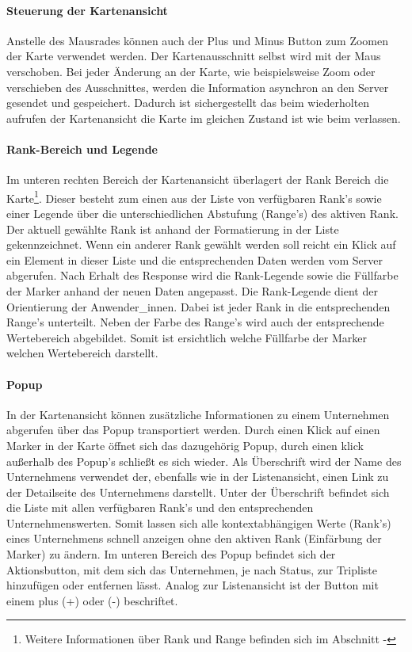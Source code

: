 \documentclass[Bachelorarbeit.tex]{subfiles}
\begin{document}
\paragraph{Steuerung der Kartenansicht}
Anstelle des Mausrades können auch der Plus und Minus Button zum Zoomen der Karte verwendet werden.
Der Kartenausschnitt selbst wird mit der Maus verschoben.
Bei jeder Änderung an der Karte, wie beispielsweise Zoom oder verschieben des Ausschnittes, werden die Information asynchron an den Server gesendet und gespeichert.
Dadurch ist sichergestellt das beim wiederholten aufrufen der Kartenansicht die Karte im gleichen Zustand ist wie beim verlassen.

\paragraph{Rank-Bereich und Legende}
Im unteren rechten Bereich der Kartenansicht überlagert der Rank Bereich die Karte\footnote{Weitere Informationen über Rank und Range befinden sich im Abschnitt  - }.
Dieser besteht zum einen aus der Liste von verfügbaren Rank's sowie einer Legende über die unterschiedlichen Abstufung (Range's) des aktiven Rank.
Der aktuell gewählte Rank ist anhand der Formatierung in der Liste gekennzeichnet. 
Wenn ein anderer Rank gewählt werden soll reicht ein Klick auf ein Element in dieser Liste und die entsprechenden Daten werden vom Server abgerufen. 
Nach Erhalt des Response wird die Rank-Legende sowie die Füllfarbe der Marker anhand der neuen Daten angepasst.
Die Rank-Legende dient der Orientierung der Anwender\_innen. 
Dabei ist jeder Rank in die entsprechenden Range's unterteilt.
Neben der Farbe des Range's wird auch der entsprechende Wertebereich abgebildet.
Somit ist ersichtlich welche Füllfarbe der Marker welchen Wertebereich darstellt.

\paragraph{Popup}
In der Kartenansicht können zusätzliche Informationen zu einem Unternehmen abgerufen über das Popup transportiert werden.
Durch einen Klick auf einen Marker in der Karte öffnet sich das dazugehörig Popup, durch einen klick außerhalb des Popup's schließt es sich wieder. 
Als Überschrift wird der Name des Unternehmens verwendet der, ebenfalls wie in der Listenansicht, einen Link zu der Detailseite des Unternehmens darstellt. 
Unter der Überschrift befindet sich die Liste mit allen verfügbaren Rank's und den entsprechenden Unternehmenswerten. 
Somit lassen sich alle kontextabhängigen Werte (Rank's) eines Unternehmens schnell anzeigen ohne den aktiven Rank (Einfärbung der Marker) zu ändern. 
Im unteren Bereich des Popup befindet sich der Aktionsbutton, mit dem sich das Unternehmen, je nach Status, zur Tripliste hinzufügen oder entfernen lässt.
Analog zur Listenansicht ist der Button mit einem plus (+) oder (-) beschriftet.
\end{document}
